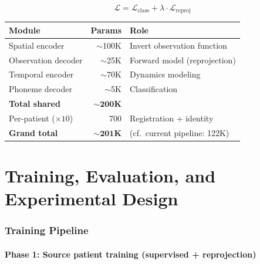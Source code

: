 \documentclass[11pt,letterpaper]{article}
\begin{document}
\begin{equation}
\boxed{\mathcal{L} = \mathcal{L}_{\text{class}} + \lambda \cdot \mathcal{L}_{\text{reproj}}}
\end{equation}

\begin{table}[ht!]\centering\small
\begin{tabular}{@{}lrl@{}}
\toprule
\textbf{Module} & \textbf{Params} & \textbf{Role} \\
\midrule
Spatial encoder & ${\sim}$100K & Invert observation function \\
Observation decoder & ${\sim}$25K & Forward model (reprojection) \\
Temporal encoder & ${\sim}$70K & Dynamics modeling \\
Phoneme decoder & ${\sim}$5K & Classification \\
\midrule
\textbf{Total shared} & $\mathbf{{\sim}200}$\textbf{K} & \\
Per-patient ($\times 10$) & 700 & Registration + identity \\
\textbf{Grand total} & $\mathbf{{\sim}201}$\textbf{K} & (cf.\ current pipeline: 122K) \\
\bottomrule
\end{tabular}
\end{table}



\part{Training, Evaluation, and Experimental Design}

\section{Training Pipeline}

\subsection{Phase 1: Source patient training (supervised + reprojection)}
\end{document}
